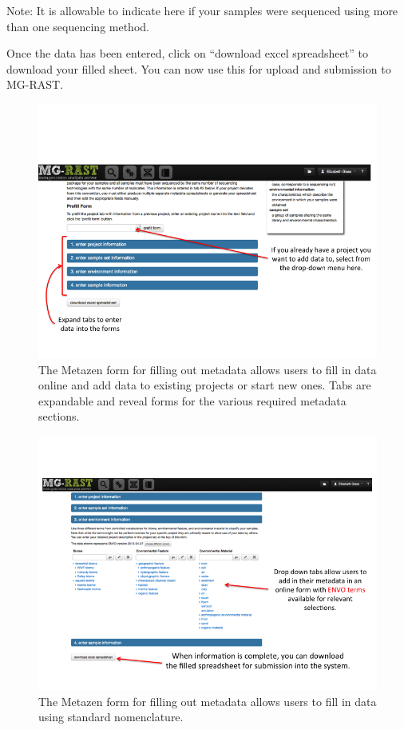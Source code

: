 \documentclass[12pt,fullpage]{report}
\begin{document}
Note: It is allowable to indicate here if your samples were sequenced using more than one sequencing method.

Once the data has been entered, click on “download excel spreadsheet” to download your filled sheet. You can now use this for upload and submission to MG-RAST.

\begin{figure}
\begin{center}
\includegraphics[width=6in]{Images/metazen_form.png}
\end{center}
\caption{The Metazen form for filling out metadata allows users to fill in data online and add data to existing projects or start new ones. Tabs are expandable and reveal forms for the various required metadata sections.}
\label{fig:metazen_form}
\end{figure}

\begin{figure}
\begin{center}
\includegraphics[width=6in]{Images/metazen_expanded.png}
\end{center}
\caption{The Metazen form for filling out metadata allows users to fill in data using standard nomenclature.}
\label{fig:metazen_expanded}
\end{figure}
\end{document}
